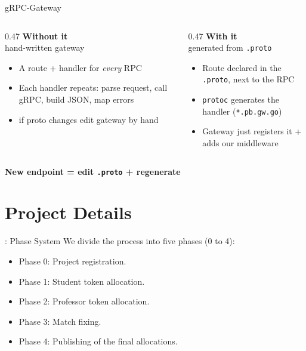 \documentclass[12pt, aspectratio=169]{beamer}
\begin{document}
\begin{frame}{gRPC-Gateway}
\small
\begin{columns}[T,onlytextwidth]
  \begin{column}{0.47\textwidth}
    \textbf{Without it}\\[-2pt]
    {\footnotesize\color{black!60} hand-written gateway}
  \begin{itemize}\setlength{\itemsep}{6pt}
      \item A route + handler for \emph{every} RPC
      \item Each handler repeats: parse request, call gRPC, build
        JSON, map errors
      \item if proto changes edit gateway by hand
    \end{itemize}
  \end{column}
  \begin{column}{0.47\textwidth}
    \textbf{With it}\\[-2pt]
    {\footnotesize\color{black!60} generated from \texttt{.proto}}
  \begin{itemize}\setlength{\itemsep}{6pt}
      \item Route declared in the \texttt{.proto}, next to the RPC
      \item \texttt{protoc} generates the handler (\texttt{*.pb.gw.go})
      \item Gateway just registers it + adds our middleware
    \end{itemize}
  \end{column}
\end{columns}

\vspace{18pt}
\begin{center}
  \color{accent}\textbf{New endpoint = edit \texttt{.proto} + regenerate}
\end{center}
\end{frame}

\section{Project Details}

\begin{frame}{\insertsection: Phase System}
We divide the process into five phases (0 to 4):
\begin{itemize}
  \item Phase 0: Project registration.
  \item Phase 1: Student token allocation.
  \item Phase 2: Professor token allocation.
  \item Phase 3: Match fixing.
  \item Phase 4: Publishing of the final allocations.
\end{itemize}
\end{frame}
\end{document}
